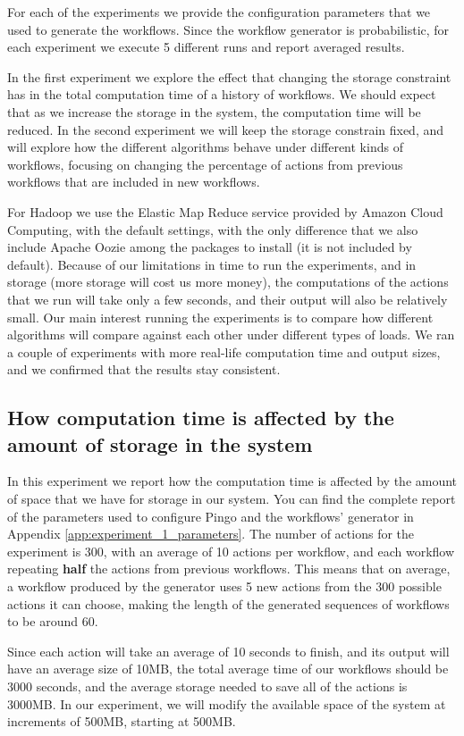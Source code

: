 For each of the experiments we provide the configuration parameters that we used to generate the workflows.  Since the workflow generator is probabilistic, for each experiment we execute 5 different runs and report averaged results.

In the first experiment we explore the effect that changing the storage constraint has in the total computation time of a history of workflows.  We should expect that as we increase the storage in the system, the computation time will be reduced.  In the second experiment we will keep the storage constrain fixed, and will explore how the different algorithms behave under different kinds of workflows, focusing on changing the percentage of actions from previous workflows that are included in new workflows.

For Hadoop we use the Elastic Map Reduce service provided by Amazon Cloud Computing, with the default settings, with the only difference that we also include Apache Oozie among the packages to install (it is not included by default).  Because of our limitations in time to run the experiments, and in storage (more storage will cost us more money), the computations of the actions that we run will take only a few seconds, and their output will also be relatively small.  Our main interest running the experiments is to compare how different algorithms will compare against each other under different types of loads.  We ran a couple of experiments with more real-life computation time and output sizes, and we confirmed that the results stay consistent.


\subsection{How computation time is affected by the amount of storage in the system}
In this experiment we report how the computation time is affected by the amount of space that we have for storage in our system.  You can find the complete report of the parameters used to configure Pingo and the workflows' generator in Appendix \ref{app:experiment_1_parameters}.  The number of actions for the experiment is 300, with an average of 10 actions per workflow, and each workflow repeating \textbf{half} the actions from previous workflows.  This means that on average, a workflow produced by the generator uses 5 new actions from the 300 possible actions it can choose, making the length of the generated sequences of workflows to be around 60.

Since each action will take an average of 10 seconds to finish, and its output will have an average size of 10MB, the total average time of our workflows should be 3000 seconds, and the average storage needed to save all of the actions is 3000MB.  In our experiment, we will modify the available space of the system at increments of 500MB, starting at 500MB. 

